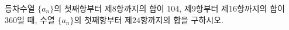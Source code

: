 등차수열 $\{a_n\}$의 첫째항부터 제$8$항까지의 합이 $104$, 제$9$항부터 제$16$항까지의 합이 $360$일 때, 수열 $\{a_n\}$의 첫째항부터 제$24$항까지의 합을 구하시오.
